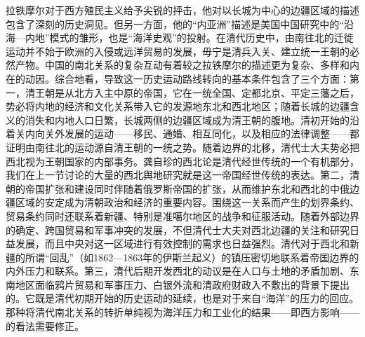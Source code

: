 \documentclass[a4paper, 12pt, openright]{ctexbook}
\begin{document}
拉铁摩尔对于西方殖民主义给予尖锐的抨击，他对以长城为中心的边疆区域的描述包含了深刻的历史洞见。但另一方面，他的“内亚洲”描述是美国中国研究中的“沿海—内地”模式的雏形，也是“海洋史观”的投射。在清代历史中，由南往北的迁徙运动并不始于欧洲的入侵或远洋贸易的发展，毋宁是清兵入关、建立统一王朝的必然产物。中国的南北关系的复杂互动有着较之拉铁摩尔的描述更为复杂、多样和内在的动因。综合地看，导致这一历史运动路线转向的基本条件包含了三个方面：第一，清王朝是从北方入主中原的帝国，它在一统全国、定都北京、平定三藩之后，势必将内地的经济和文化关系带入它的发源地东北和西北地区；随着长城的边疆含义的消失和内地人口日繁，长城两侧的边疆区域成为清王朝的腹地。清初开始的沿着关内向关外发展的运动——移民、通婚、相互同化，以及相应的法律调整——都证明由南往北的运动源自清王朝的一统之势。随着边界的北移，清代士大夫势必把西北视为王朝国家的内部事务。龚自珍的西北论是清代经世传统的一个有机部分，我们在上一节讨论的大量的西北舆地研究就是这一帝国经世传统的表达。第二，清朝的帝国扩张和建设同时伴随着俄罗斯帝国的扩张，从而维护东北和西北的中俄边疆区域的安定成为清朝政治和经济的重要内容。围绕这一关系而产生的划界条约、贸易条约同时还联系着新疆、特别是准噶尔地区的战争和征服活动。随着外部边界的确定、跨国贸易和军事冲突的发展，不但清代士大夫对西北边疆的关注和研究日益发展，而且中央对这一区域进行有效控制的需求也日益强烈。清代对于西北和新疆的所谓“回乱”（如1862—1863年的伊斯兰起义）的镇压密切地联系着帝国边界的内外压力和联系。第三，清代后期开发西北的动议是在人口与土地的矛盾加剧、东南地区面临鸦片贸易和军事压力、白银外流和清政府财政入不敷出的背景下提出的。它既是清代初期开始的历史运动的延续，也是对于来自“海洋”的压力的回应。那种将清代南北关系的转折单纯视为海洋压力和工业化的结果——即西方影响——的看法需要修正。
\end{document}
